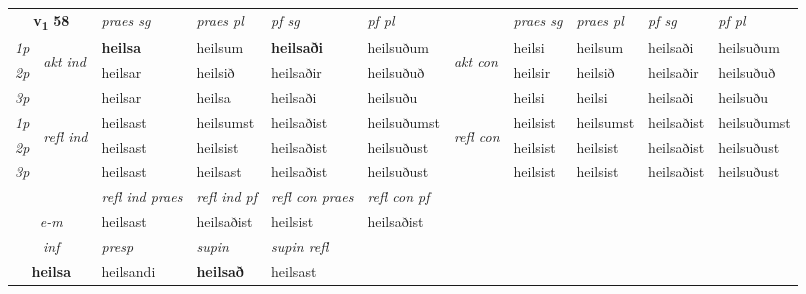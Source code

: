 \noindent
\begin{tabular}{lllllllllll} \toprule
\multicolumn{2}{c}{\textbf{v{\textsubscript{1}}} \Large{\textbf{58}}}  &  \textit{praes sg}  & \textit{praes pl}  &\textit{ pf sg} & \textit{pf pl} &  &  \textit{praes sg}  & \textit{praes pl}  & \textit{pf sg} & \textit{pf pl } \\*
	\cmidrule{3-6} \cmidrule{8-11}
 {\textit{1p}} & \multirow{3}{*}{\begin{turn}{90}\textit{akt ind}\end{turn}} & \textbf{heilsa} & heilsum & \textbf{heilsaði} & heilsuðum & \multirow{3}{*}{\begin{turn}{90}\textit{akt con}\end{turn}} &heilsi & heilsum & heilsaði & heilsuðum\\*
 {\textit{2p}} &  &  heilsar  & heilsið & heilsaðir & heilsuðuð & & heilsir & heilsið & heilsaðir & heilsuðuð \\*
{\textit{3p}} &  & heilsar & heilsa & heilsaði & heilsuðu & & heilsi & heilsi& heilsaði & heilsuðu \\*
\cmidrule{3-6} \cmidrule{8-11}
 {\textit{1p}} & \multirow{3}{*}{\begin{turn}{90}\textit{refl ind}\end{turn}}  & heilsast & heilsumst & heilsaðist & heilsuðumst & \multirow{3}{*}{\begin{turn}{90}\textit{refl con}\end{turn}}  &heilsist & heilsumst & heilsaðist & heilsuðumst \\*
 {\textit{2p}} &  & heilsast & heilsist & heilsaðist & heilsuðust & &heilsist & heilsist & heilsaðist & heilsuðust \\*
 {\textit{3p}}  & & heilsast & heilsast & heilsaðist & heilsuðust & & heilsist & heilsist& heilsaðist & heilsuðust \\*
\cmidrule{3-6} \cmidrule{8-11}

 & & \textit{refl ind praes} & \textit{refl ind pf} & \textit{refl con praes} & \textit{refl con pf} \\*
 \multicolumn{2}{c}{ \textit{e-m} }& heilsast & heilsaðist & heilsist & heilsaðist \\*

\cmidrule{3-5}
   \multicolumn{2}{c}{\textit{inf}}     & \textit{presp} & \textit{supin} & \textit{supin refl}  \\*
  \multicolumn{2}{c}{\textbf{heilsa}}      & heilsandi &  \textbf{heilsað} & heilsast  \\*
\end{tabular}

